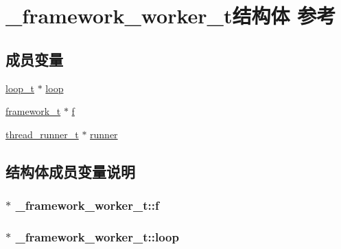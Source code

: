 \hypertarget{a00012}{}\section{\+\_\+framework\+\_\+worker\+\_\+t结构体 参考}
\label{a00012}
\subsection*{成员变量}
\begin{DoxyCompactItemize}
\item 
\hyperlink{a00047_a9c3ad1cd2de83e09f3a7b59fa82c94ee_a9c3ad1cd2de83e09f3a7b59fa82c94ee}{loop\+\_\+t} $\ast$ \hyperlink{a00012_ab4522a69094d41136b14e382ef3fcb8a_ab4522a69094d41136b14e382ef3fcb8a}{loop}
\item 
\hyperlink{a00047_a6149d769f6f07ed14a40a271c95d8463_a6149d769f6f07ed14a40a271c95d8463}{framework\+\_\+t} $\ast$ \hyperlink{a00012_a807e1f788cb43947cfe5c14c95b8cd22_a807e1f788cb43947cfe5c14c95b8cd22}{f}
\item 
\hyperlink{a00047_a9054159cde2f926ef61c28ce1e555199_a9054159cde2f926ef61c28ce1e555199}{thread\+\_\+runner\+\_\+t} $\ast$ \hyperlink{a00012_a815b2ce0f2ea29ae265bb7dc2e804165_a815b2ce0f2ea29ae265bb7dc2e804165}{runner}
\end{DoxyCompactItemize}


\subsection{结构体成员变量说明}
\hypertarget{a00012_a807e1f788cb43947cfe5c14c95b8cd22_a807e1f788cb43947cfe5c14c95b8cd22}{}
\subsubsection[{f}]{$\ast$ \+\_\+framework\+\_\+worker\+\_\+t\+::f}\label{a00012_a807e1f788cb43947cfe5c14c95b8cd22_a807e1f788cb43947cfe5c14c95b8cd22}
\hypertarget{a00012_ab4522a69094d41136b14e382ef3fcb8a_ab4522a69094d41136b14e382ef3fcb8a}{}
\subsubsection[{loop}]{$\ast$ \+\_\+framework\+\_\+worker\+\_\+t\+::loop}\label{a00012_ab4522a69094d41136b14e382ef3fcb8a_ab4522a69094d41136b14e382ef3fcb8a}
\hypertarget{a00012_a815b2ce0f2ea29ae265bb7dc2e804165_a815b2ce0f2ea29ae265bb7dc2e804165}{}
